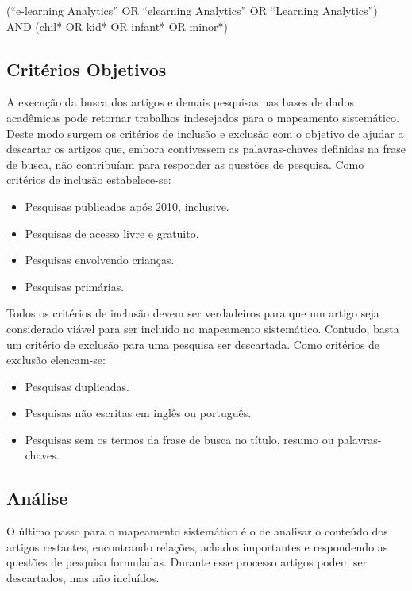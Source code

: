 \documentclass[12pt]{article}
\begin{document}
\begin{framed}
 \raggedright (``e-learning Analytics'' OR ``elearning Analytics'' OR ``Learning Analytics'') \\ AND (chil* OR kid* OR infant* OR minor*)
\end{framed}


\subsection{Critérios Objetivos}\label{a:3}

A execução da busca dos artigos e demais pesquisas nas bases de dados acadêmicas pode retornar trabalhos indesejados para o mapeamento sistemático. Deste modo surgem os critérios de inclusão e exclusão com o objetivo de ajudar a descartar os artigos que, embora
contivessem as palavras-chaves definidas na frase de busca, não contribuíam para responder as questões de pesquisa. Como critérios de inclusão estabelece-se:

\begin{itemize}
    \item Pesquisas publicadas após 2010, inclusive.
    \item Pesquisas de acesso livre e gratuito.
    \item Pesquisas envolvendo crianças.
    \item Pesquisas primárias.
\end{itemize}

Todos os critérios de inclusão devem ser verdadeiros para que um artigo seja considerado viável para ser incluído no mapeamento sistemático. Contudo, basta um critério de exclusão para uma pesquisa ser descartada. Como critérios de exclusão elencam-se: 

\begin{itemize}
    \item Pesquisas duplicadas.
    \item Pesquisas não escritas em inglês ou português.
    \item Pesquisas sem os termos da frase de busca no título, resumo ou palavras-chaves.
\end{itemize}


\subsection{Análise}\label{a:4}

O último passo para o mapeamento sistemático é o de analisar o conteúdo dos artigos restantes, encontrando relações, achados importantes e respondendo as questões de pesquisa formuladas. Durante esse processo artigos podem ser descartados, mas não incluídos. 
\end{document}
